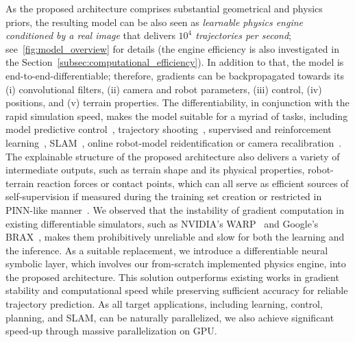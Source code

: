 As the proposed architecture comprises substantial geometrical and physics priors,
the resulting model can be also seen as \emph{learnable physics engine conditioned by a real image}
that delivers \emph{$10^4$ trajectories per second}; see~\autoref{fig:model_overview} for details (the engine efficiency is also investigated in the Section~\ref{subsec:computational_efficiency}).
In addition to that, the model is end-to-end-differentiable; therefore, gradients can be backpropagated towards its
(i) convolutional filters, (ii) camera and robot parameters, (iii) control, (iv) positions, and (v) terrain properties.
The differentiability, in conjunction with the rapid simulation speed, makes the model suitable for a myriad of tasks,
including model predictive control~\cite{Amos-NEURIPS-2018}, trajectory shooting~\cite{Zeng-CVPR-2019},
supervised and reinforcement learning~\cite{schulman2017proximal}, SLAM~\cite{factorgraph-2017},
online robot-model reidentification or camera recalibration~\cite{Moravec-CVWW-2018}.
The explainable structure of the proposed architecture also delivers a variety of intermediate outputs,
such as terrain shape and its physical properties, robot-terrain reaction forces or contact points,
which can all serve as efficient sources of self-supervision if measured during the training set creation or restricted
in PINN-like manner~\cite{Farea-AI-2024}.
We observed that the instability of gradient computation in existing differentiable simulators,
such as NVIDIA's WARP~\cite{warp2022} and Google's BRAX~\cite{brax2021}, makes them prohibitively unreliable
and slow for both the learning and the inference.
As a suitable replacement, we introduce a differentiable neural symbolic layer, which involves our
from-scratch implemented physics engine, into the proposed architecture.
This solution outperforms existing works in gradient stability and computational speed
while preserving sufficient accuracy
for reliable trajectory prediction.
As all target applications, including learning, control, planning, and SLAM, can be naturally parallelized,
we also achieve significant speed-up through massive parallelization on GPU.

